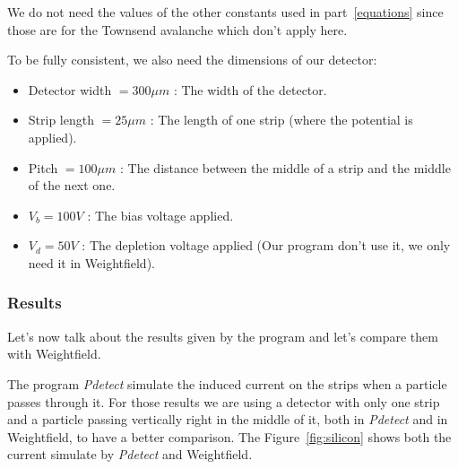 \documentclass[11pt]{article}
\begin{document}
				We do not need the values of the other constants used in part~\ref{equations} since
				those are for the Townsend avalanche which don't apply here.

				To be fully consistent, we also need the dimensions of our detector:

				\begin{itemize}

					\item Detector width $= 300 \mu m$ : The width of the detector.
					\item Strip length $= 25 \mu m$ : The length of one strip (where the potential is
						applied).
					\item Pitch $= 100 \mu m$ : The distance between the middle of a strip and the middle
						of the next one.
					\item $V_b = 100 V$ : The bias voltage applied.
					\item $V_d = 50 V$ : The depletion voltage applied (Our program don't use it, we only
						need it in Weightfield).

				\end{itemize}

			\subsubsection*{Results}

				Let's now talk about the results given by the program and let's compare them with Weightfield.

				The program \textit{Pdetect} simulate the induced current on the strips when a particle passes through it.
				For those results we are using a detector with only one strip and a particle passing vertically right in
				the middle of it, both in \textit{Pdetect} and in Weightfield, to have a better comparison. The
				Figure~\ref{fig:silicon} shows both the current simulate by \textit{Pdetect} and Weightfield.
\end{document}
